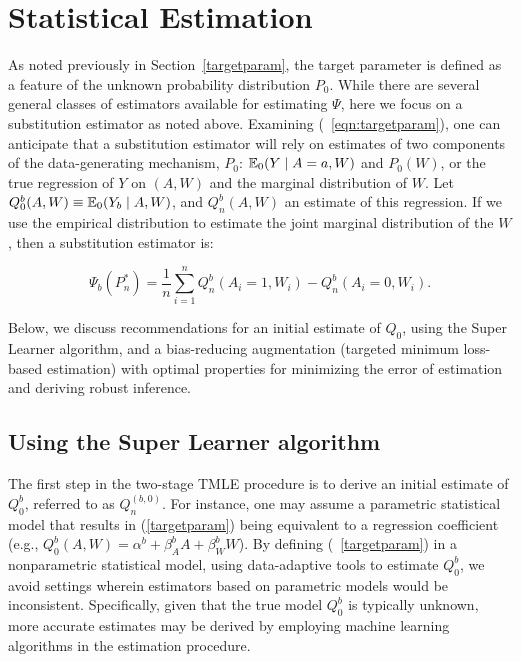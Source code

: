 \section{Statistical Estimation}\label{estimation}

As noted previously in Section~\ref{targetparam}, the target parameter is
defined as a feature of the unknown probability distribution $P_{0}$. While
there are several general classes of estimators available for estimating
$\Psi$, here we focus on a substitution estimator as noted above.
Examining (~\ref{eqn:targetparam}), one can anticipate that a substitution
estimator will rely on estimates of two components of the data-generating
mechanism, $P_0$: $\mathbb{E}_0 (Y \mid A = a, W)$ and $P_0(W)$, or the true regression
of $Y$ on $(A, W)$ and the marginal distribution of $W$. Let
$Q^{b}_{0}(A, W) \equiv \mathbb{E}_{0}(Y_{b} \mid A, W)$, and $Q^{b}_{n}(A, W)$ an
estimate of this regression. If we use the empirical distribution to estimate
the joint marginal distribution of the $W$, then a substitution estimator is:

\begin{equation}
\label{subest}
  \Psi_b(P_{n}^{*}) = \frac{1}{n}\sum_{i = 1}^{n} Q^{b}_{n}(A_i = 1, W_{i}) -
  Q^{b}_{n}(A_i = 0, W_{i}).
\end{equation}

Below, we discuss recommendations for an initial estimate of $Q_0$, using the
Super Learner algorithm, and a bias-reducing augmentation (targeted minimum
loss-based estimation) with optimal properties for minimizing the error of
estimation and deriving robust inference.

\subsection{Using the Super Learner algorithm}\label{superlearner}

The first step in the two-stage TMLE procedure is to derive an initial estimate
of $Q^{b}_{0}$, referred to as $Q^{(b, 0)}_{n}$. For instance, one may assume
a parametric statistical model that results in (\ref{targetparam}) being
equivalent to a regression coefficient (e.g., $Q^{b}_{0}(A, W) = \alpha^{b} +
\beta^{b}_{A}A + \beta^{b}_{W}W$). By defining (~\ref{targetparam}) in a
nonparametric statistical model, using data-adaptive tools to estimate
$Q^{b}_{0}$, we avoid settings wherein estimators based on parametric models
would be inconsistent. Specifically, given that the true model $Q^{b}_{0}$ is
typically unknown, more accurate estimates may be derived by employing machine
learning algorithms in the estimation procedure.

